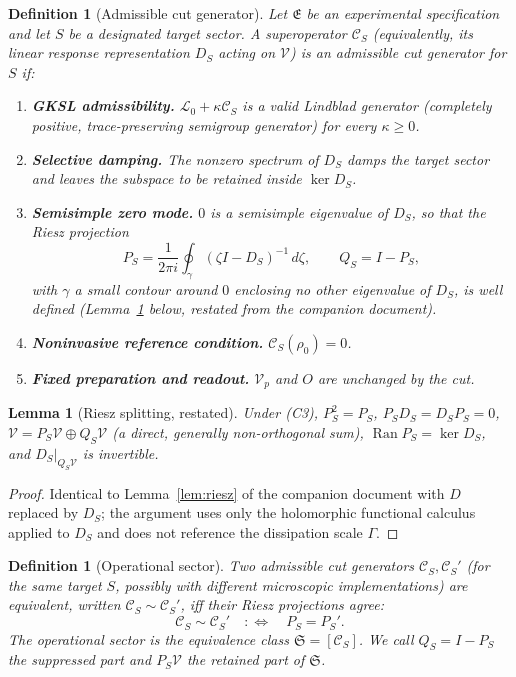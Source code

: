 \documentclass[11pt]{article}
\newtheorem{lemma}[theorem]{Lemma}
\newtheorem{definition}[theorem]{Definition}
\newcommand{\Ran}{\operatorname{Ran}}
\renewcommand{\S}{\mathfrak S}
\newcommand{\E}{\mathfrak E}
\begin{document}
\begin{definition}[Admissible cut generator]
\label{def:admissible}
Let $\E$ be an experimental specification and let $S$ be a designated
target sector. A superoperator $\mathcal C_S$ (equivalently, its linear
response representation $D_S$ acting on $\mathcal V$) is an
\emph{admissible cut generator} for $S$ if:
\begin{enumerate}[label=(C\arabic*),nosep]
\item \textbf{GKSL admissibility.} $\mathcal L_0+\kappa\mathcal C_S$ is a
      valid Lindblad generator (completely positive, trace-preserving
      semigroup generator) for every $\kappa\ge0$.
\item \textbf{Selective damping.} The nonzero spectrum of $D_S$ damps the
      target sector and leaves the subspace to be retained inside
      $\ker D_S$.
\item \textbf{Semisimple zero mode.} $0$ is a semisimple eigenvalue of
      $D_S$, so that the Riesz projection
      \[
      P_S=\frac1{2\pi i}\oint_{\gamma}(\zeta I-D_S)^{-1}\,d\zeta,
      \qquad Q_S=I-P_S,
      \]
      with $\gamma$ a small contour around $0$ enclosing no other
      eigenvalue of $D_S$, is well defined (Lemma~\ref{lem:riesz-recall}
      below, restated from the companion document).
\item \textbf{Noninvasive reference condition.} $\mathcal C_S(\rho_0)=0$.
\item \textbf{Fixed preparation and readout.} $\mathcal V_p$ and $O$ are
      unchanged by the cut.
\end{enumerate}
\end{definition}

\begin{lemma}[Riesz splitting, restated]
\label{lem:riesz-recall}
Under (C3), $P_S^2=P_S$, $P_SD_S=D_SP_S=0$,
$\mathcal V=P_S\mathcal V\oplus Q_S\mathcal V$ (a direct, generally
non-orthogonal sum), $\Ran P_S=\ker D_S$, and $D_S|_{Q_S\mathcal V}$ is
invertible.
\end{lemma}

\begin{proof}
Identical to Lemma~\ref{lem:riesz} of the companion document with $D$
replaced by $D_S$; the argument uses only the holomorphic functional
calculus applied to $D_S$ and does not reference the dissipation scale
$\Gamma$.
\end{proof}

\begin{definition}[Operational sector]
\label{def:sector}
Two admissible cut generators $\mathcal C_S,\mathcal C_S'$ (for the same
target $S$, possibly with different microscopic implementations) are
\emph{equivalent}, written $\mathcal C_S\sim\mathcal C_S'$, iff their
Riesz projections agree:
\[
\mathcal C_S\sim\mathcal C_S'
\quad:\Longleftrightarrow\quad
P_S=P_S'.
\]
The \emph{operational sector} is the equivalence class
$\S=[\mathcal C_S]$. We call $Q_S=I-P_S$ the \emph{suppressed part} and
$P_S\mathcal V$ the \emph{retained part} of $\S$.
\end{definition}
\end{document}
